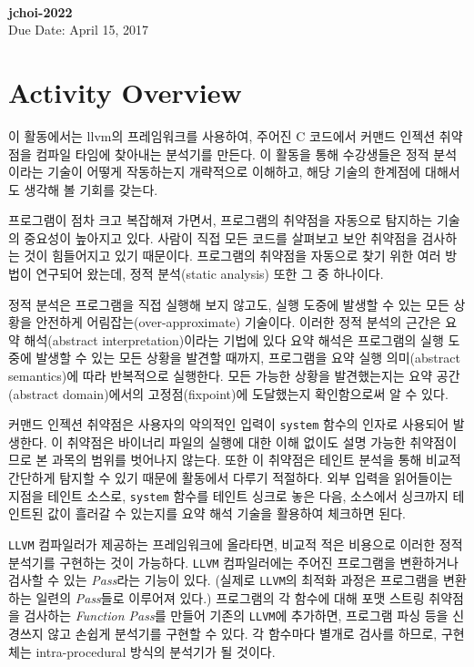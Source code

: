 \documentclass[a4paper, 11pt]{article}
\theoremstyle{definition}
\begin{document}
 \\
         {\phantom{} \hfill \textbf{jchoi-2022}} \\
         {\phantom{} \hfill Due Date: April 15, 2017} \\

\section{Activity Overview}
이 활동에서는 llvm의 프레임워크를 사용하여, 주어진 C 코드에서 커맨드 인젝션
취약점을 컴파일 타임에 찾아내는 분석기를 만든다. 이 활동을 통해 수강생들은 정적
분석이라는 기술이 어떻게 작동하는지 개략적으로 이해하고, 해당 기술의 한계점에
대해서도 생각해 볼 기회를 갖는다.

프로그램이 점차 크고 복잡해져 가면서, 프로그램의 취약점을 자동으로 탐지하는
기술의 중요성이 높아지고 있다. 사람이 직접 모든 코드를 살펴보고 보안 취약점을
검사하는 것이 힘들어지고 있기 때문이다. 프로그램의 취약점을 자동으로 찾기 위한
여러 방법이 연구되어 왔는데, 정적 분석(static analysis) 또한 그 중 하나이다.

정적 분석은 프로그램을 직접 실행해 보지 않고도, 실행 도중에 발생할 수 있는 모든
상황을 안전하게 어림잡는(over-approximate) 기술이다. 이러한 정적 분석의 근간은
요약 해석(abstract interpretation)이라는 기법에 있다\cite{abstract, framework}
요약 해석은 프로그램의 실행 도중에 발생할 수 있는 모든 상황을 발견할 때까지,
프로그램을 요약 실행 의미(abstract semantics)에 따라 반복적으로 실행한다. 모든
가능한 상황을 발견했는지는 요약 공간(abstract domain)에서의 고정점(fixpoint)에
도달했는지 확인함으로써 알 수 있다\cite{PALecture}.

커맨드 인젝션 취약점은 사용자의 악의적인 입력이 \texttt{system} 함수의 인자로
사용되어 발생한다. 이 취약점은 바이너리 파일의 실행에 대한 이해 없이도 설명
가능한 취약점이므로 본 과목의 범위를 벗어나지 않는다. 또한 이 취약점은 테인트
분석을 통해 비교적 간단하게 탐지할 수 있기 때문에 활동에서 다루기 적절하다. 외부
입력을 읽어들이는 지점을 테인트 소스로, \texttt{system} 함수를 테인트 싱크로
놓은 다음, 소스에서 싱크까지 테인트된 값이 흘러갈 수 있는지를 요약 해석 기술을
활용하여 체크하면 된다.

\texttt{LLVM} 컴파일러가 제공하는 프레임워크에 올라타면, 비교적 적은 비용으로
이러한 정적 분석기를 구현하는 것이 가능하다. \texttt{LLVM} 컴파일러에는 주어진
프로그램을 변환하거나 검사할 수 있는 \emph{Pass}라는 기능이 있다\cite{LLVMPass}.
(실제로 \texttt{LLVM}의 최적화 과정은 프로그램을 변환하는 일련의 \emph{Pass}들로
이루어져 있다.) 프로그램의 각 함수에 대해 포맷 스트링 취약점을 검사하는
\emph{Function Pass}를 만들어 기존의 \texttt{LLVM}에 추가하면, 프로그램 파싱
등을 신경쓰지 않고 손쉽게 분석기를 구현할 수 있다. 각 함수마다 별개로 검사를
하므로, 구현체는 intra-procedural 방식의 분석기가 될 것이다.
\end{document}
